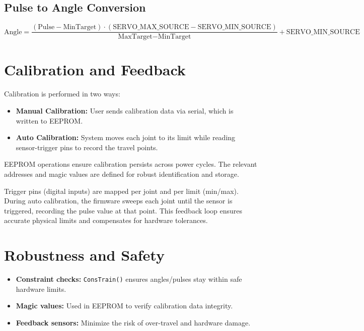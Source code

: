 \documentclass[12pt,a4paper]{report}
\begin{document}
\subsection{Pulse to Angle Conversion}
\begin{equation}
\text{Angle} = \frac{(\text{Pulse} - \text{MinTarget}) \cdot (\text{SERVO\_MAX\_SOURCE} - \text{SERVO\_MIN\_SOURCE})}{\text{MaxTarget} - \text{MinTarget}} + \text{SERVO\_MIN\_SOURCE}
\end{equation}

\section{Calibration and Feedback}
Calibration is performed in two ways:
\begin{itemize}
    \item \textbf{Manual Calibration:} User sends calibration data via serial, which is written to EEPROM.
    \item \textbf{Auto Calibration:} System moves each joint to its limit while reading sensor-trigger pins to record the travel points.
\end{itemize}
EEPROM operations ensure calibration persists across power cycles. The relevant addresses and magic values are defined for robust identification and storage.

Trigger pins (digital inputs) are mapped per joint and per limit (min/max). During auto calibration, the firmware sweeps each joint until the sensor is triggered, recording the pulse value at that point. This feedback loop ensures accurate physical limits and compensates for hardware tolerances.

\section{Robustness and Safety}
\begin{itemize}
    \item \textbf{Constraint checks:} \texttt{ConsTrain()} ensures angles/pulses stay within safe hardware limits.
    \item \textbf{Magic values:} Used in EEPROM to verify calibration data integrity.
    \item \textbf{Feedback sensors:} Minimize the risk of over-travel and hardware damage.
\end{itemize}
\end{document}
